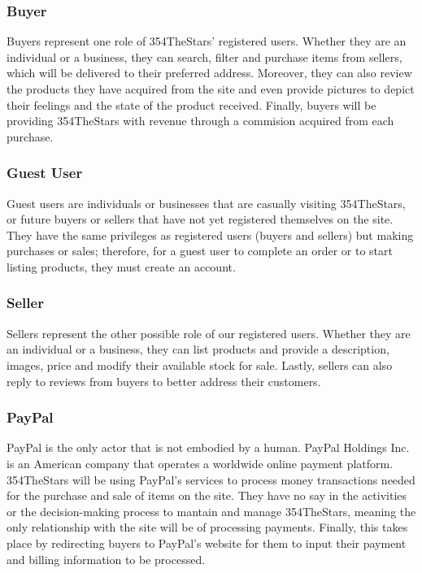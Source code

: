 \documentclass[11pt]{article}
\newcounter{use case ID}
\begin{document}
\subsubsection{Buyer}
Buyers represent one role of 354TheStars' registered users. Whether they are
an individual or a business, they can search, filter and purchase items from sellers,
which will be delivered to their preferred address. Moreover, they can also review
the products they have acquired from the site and even provide pictures to depict
their feelings and the state of the product received. Finally, buyers will be providing
354TheStars with revenue through a commision acquired from each purchase.
\subsubsection{Guest User}
Guest users are individuals or businesses that are casually visiting 354TheStars,
or future buyers or sellers that have not yet registered themselves on the site.
They have the same privileges as registered users (buyers and sellers) but making
purchases or sales; therefore, for a guest user to complete an order or
to start listing products, they must create an account.
\subsubsection{Seller}
Sellers represent the other possible role of our registered users. Whether they are
an individual or a business, they can list products and provide a description,
images, price and modify their available stock for sale. Lastly, sellers can also
reply to reviews from buyers to better address their customers.
\subsubsection{PayPal}
PayPal is the only actor that is not embodied by a human. PayPal Holdings Inc. is
an American company that operates a worldwide online payment platform. 354TheStars
will be using PayPal's services to process money transactions needed for the purchase
and sale of items on the site. They have no say in the activities or the
decision-making process to mantain and manage 354TheStars, meaning the only
relationship with the site will be of processing payments. Finally, this takes
place by redirecting buyers to PayPal's website for them to input their payment
and billing information to be processed.
\end{document}
